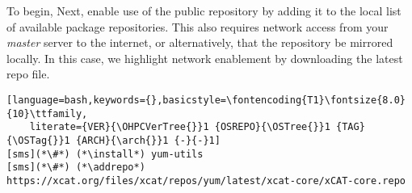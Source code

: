 To begin,
\else
Next, 
\fi
enable use of the public \xCAT{} repository by adding it to the local list
of available package repositories. This also requires network access from
your {\em master} server to the internet, or alternatively, that
the repository be mirrored locally. In this case, we highlight network
enablement by downloading the latest \xCAT{} repo file.

\begin{lstlisting}[language=bash,keywords={},basicstyle=\fontencoding{T1}\fontsize{8.0}{10}\ttfamily,
	literate={VER}{\OHPCVerTree{}}1 {OSREPO}{\OSTree{}}1 {TAG}{\OSTag{}}1 {ARCH}{\arch{}}1 {-}{-}1]
[sms](*\#*) (*\install*) yum-utils
[sms](*\#*) (*\addrepo*) https://xcat.org/files/xcat/repos/yum/latest/xcat-core/xCAT-core.repo
\end{lstlisting}

